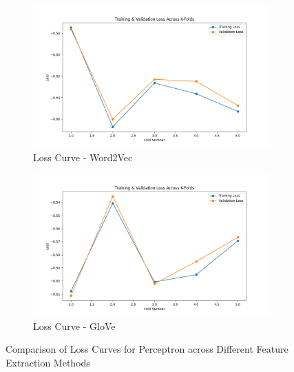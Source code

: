 \begin{figure}[H]
    \begin{subfigure}[b]{0.48\textwidth}
        \includegraphics[width=\textwidth]{img/report_info/img/2.1.Perceptron/best_perceptron_word2vec_loss.png}
        \caption{Loss Curve - Word2Vec}
        \label{fig:perc-word2vec-loss}
    \end{subfigure}
    \begin{subfigure}[b]{0.48\textwidth}
        \includegraphics[width=\textwidth]{img/report_info/img/2.1.Perceptron/best_perceptron_glove_loss.png}
        \caption{Loss Curve - GloVe}
        \label{fig:perc-glove-loss}
    \end{subfigure}
    
    \caption{Comparison of Loss Curves for Perceptron across Different Feature Extraction Methods}
    \label{fig:perc-loss-group}
\end{figure}

